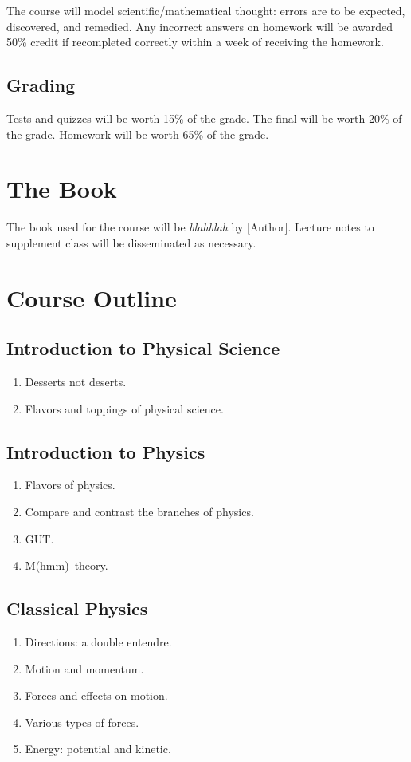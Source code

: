 \documentclass[11pt,article,oneside]{memoir}
\begin{document}
The course will model scientific/mathematical thought: errors are to be expected, discovered, and remedied. Any incorrect answers
on homework will be awarded 50\% credit if recompleted correctly within a week of receiving the homework.
\subsection*{Grading}
	Tests and quizzes will be worth 15\% of the grade. The final will be worth 20\% of the grade. Homework will be worth 65\% of the grade.


\section*{The Book}
The book used for the course will be \textit{blahblah} by [Author]. Lecture notes to supplement class will be disseminated
as necessary.


\section*{Course Outline}
\subsection*{Introduction to Physical Science}
\begin{enumerate}
\item Desserts not deserts.
\item Flavors and toppings of physical science.
\end{enumerate}
\subsection*{Introduction to Physics}
\begin{enumerate}
\item Flavors of physics.
\item Compare and contrast the branches of physics.
\item GUT.
\item M(hmm)--theory.
\end{enumerate}
\subsection*{Classical Physics}
\begin{enumerate}
\item Directions: a double entendre.
\item Motion and momentum.
\item Forces and effects on motion.
\item Various types of forces.
\item Energy: potential and kinetic.
\end{enumerate}
\end{document}
